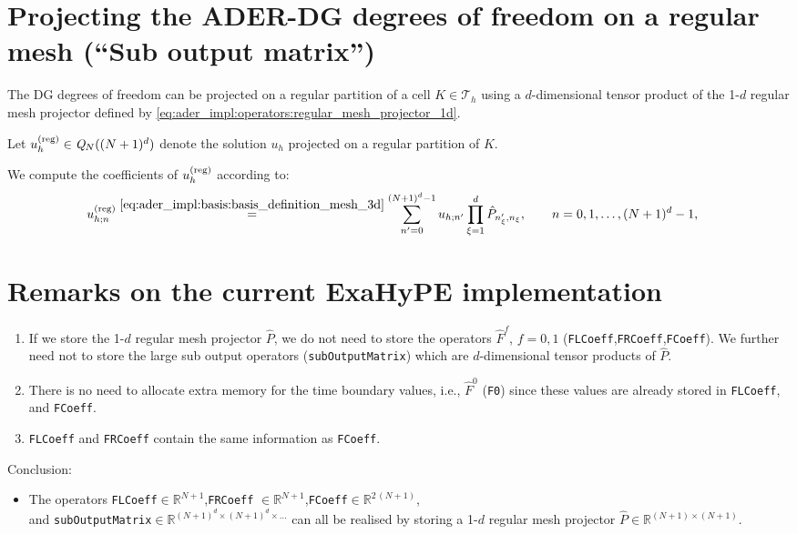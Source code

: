 \documentclass{scrreprt}
\theoremstyle{definition}
\theoremstyle{nonumberplain}
\newcommand{\tria}{\mathcal{T}_h}
\newcommand{\cell}{K}
\newcommand{\polyspace}[3]{\mathit{#1}_{#2}(#3)}
\begin{document}
\section{Projecting the ADER-DG degrees of freedom on a regular mesh (``Sub
output matrix'')}
The DG degrees of freedom can be projected on a regular partition
of a cell $\cell\in\tria$
using a $d$-dimensional tensor product of the 1-$d$
regular mesh projector defined
by \eqref{eq:ader_impl:operators:regular_mesh_projector_1d}.

Let $u_h^{(\textup{reg})}\in\polyspace{Q}{N}{{(N+1)^d}}$ denote the
solution $u_h$ projected on a regular partition of $\cell$.

We compute the coefficients of $u_h^{(\textup{reg})}$
according to:
\begin{align}
u_{h;n}^{(\textup{reg})}
&\overset{\eqref{eq:ader_impl:basis:basis_definition_mesh_3d}}
{=}
\sum_{n'=0}^{(N+1)^d-1}
u_{h;n'}
\prod_{\xi=1}^{d}
\hat{P}_{n'_\xi,n_{\xi}}
,
\qquad n=0,1,\ldots,(N+1)^d-1,
\end{align}

\section{Remarks on the current ExaHyPE implementation}
\begin{enumerate}
  \item If we store the 1-$d$ regular mesh projector $\hat{P}$, we
  do not need to store the operators $\hat{F}^f$, $f=0,1$
  (\texttt{FLCoeff},\texttt{FRCoeff},\texttt{FCoeff}).
  We further need not to store the large sub output operators
  (\texttt{subOutputMatrix})
  which are $d$-dimensional tensor products of $\hat{P}$.
  \item There is no need to allocate extra memory for the time
  boundary values, i.e., $\hat{F}^0$ (\texttt{F0})
  since these values are already stored
  in \texttt{FLCoeff}, and \texttt{FCoeff}.
  \item \texttt{FLCoeff} and \texttt{FRCoeff}
  contain the same information as \texttt{FCoeff}.
\end{enumerate}

Conclusion:
\begin{itemize}
  \item
  The operators
  \texttt{FLCoeff}$\in\mathbb{R}^{N+1}$,\texttt{FRCoeff}
  $\in\mathbb{R}^{N+1}$,\texttt{FCoeff}$\in\mathbb{R}^{2\,(N+1)}$,\\
  and \texttt{subOutputMatrix}$\in\mathbb{R}^{(N+1)^d\times(N+1)^d\times\ldots}$
  can all be realised by storing a 1-$d$ regular mesh projector
  $\hat{P}\in\mathbb{R}^{(N+1)\times(N+1)}$.
\end{itemize}
\end{document}
